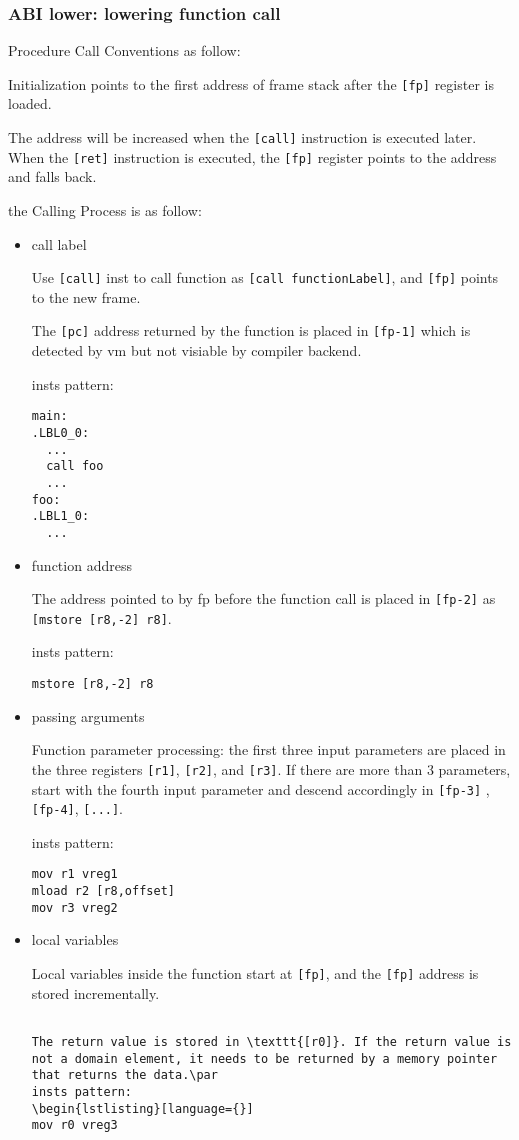 \subsubsection{ABI lower: lowering function call}
    
Procedure Call Conventions as follow:

Initialization points to the first address of frame stack after the \texttt{[fp]} register is loaded.
    
The address will be increased when the \texttt{[call]}  instruction is executed later. When the \texttt{[ret]} instruction is executed, the \texttt{[fp]} register points to the address and falls back.
    
    
the Calling Process is as follow:
\begin{itemize}
    \item call label

Use  \texttt{[call]} inst to call function as \texttt{[call functionLabel]}, and \texttt{[fp]} points to the new frame.\par
The \texttt{[pc]} address returned by the function is placed in \texttt{[fp-1]} which is detected by vm but not visiable by compiler backend.\par
insts pattern:
\begin{lstlisting}[language={}]
main:
.LBL0_0:
  ...
  call foo
  ...
foo:
.LBL1_0:
  ...
\end{lstlisting}
    \item function address

The address pointed to by fp before the function call is placed in  \texttt{[fp-2]} as \texttt{[mstore [r8,-2] r8]}.\par
insts pattern:
\begin{lstlisting}[language={}]
mstore [r8,-2] r8
\end{lstlisting}
    \item passing arguments

Function parameter processing: the first three input parameters are placed in the three registers \texttt{[r1]}, \texttt{[r2]}, and \texttt{[r3]}.
If there are more than 3 parameters, start with the fourth input parameter and descend accordingly in \texttt{[fp-3]} , \texttt{[fp-4]}, \texttt{[...]}. \par
insts pattern:
\begin{lstlisting}[language={}]
mov r1 vreg1
mload r2 [r8,offset]
mov r3 vreg2
\end{lstlisting}
    \item  local variables

Local variables inside the function start at \texttt{[fp]}, and the \texttt{[fp]} address is stored incrementally. 
\begin{lstlisting}[language={}]

The return value is stored in \texttt{[r0]}. If the return value is not a domain element, it needs to be returned by a memory pointer that returns the data.\par
insts pattern:
\begin{lstlisting}[language={}]
mov r0 vreg3
\end{lstlisting}
\end{itemize}

